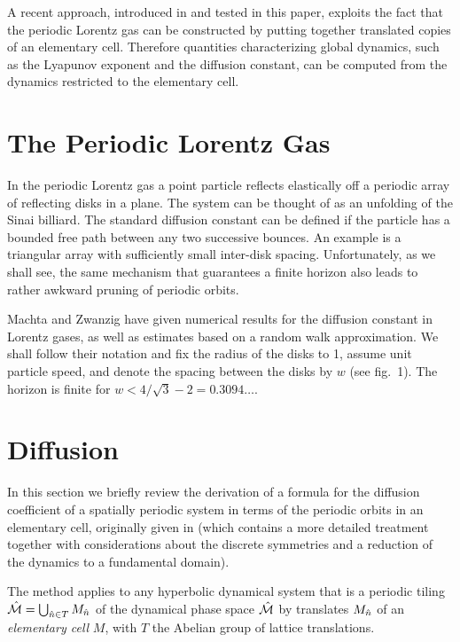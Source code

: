 \documentclass[pre,twocolumn,groupedaddress,showpacs,showkeys]{revtex4}
\begin{document}
A recent approach, introduced in  and
tested in this paper, exploits the fact that the periodic Lorentz
gas
can be constructed by putting together
translated copies of an elementary cell.
Therefore quantities characterizing global dynamics, such as
the Lyapunov exponent and the diffusion constant, can be
computed from the dynamics restricted to the elementary cell.

\section{The Periodic Lorentz Gas}
In the periodic Lorentz gas
a point particle reflects elastically off
a periodic array of reflecting disks in a plane.
The system can
be thought of as an unfolding of the Sinai billiard.
The standard diffusion constant can be defined if the particle has a bounded
free path between any two successive bounces.
An example is a triangular array with sufficiently small
inter-disk spacing.
Unfortunately, as we shall see,
the same mechanism that guarantees a finite horizon
also leads to rather awkward pruning of periodic orbits.


Machta and Zwanzig have given numerical results
for the diffusion constant in Lorentz gases,  as well as
estimates based on a random walk approximation. We shall follow
their notation and fix the radius of the disks to 1,
assume unit particle speed, and
denote the spacing between the disks by $w$ (see fig.~1).
The horizon is finite for $w < 4/\sqrt{3}-2 = 0.3094\dots$.

\section{Diffusion}
In this section we briefly review the
derivation of a formula for the diffusion coefficient
of a spatially periodic system in terms of the periodic orbits in an elementary
cell, originally given in  (which contains
a more detailed treatment together with considerations about the
discrete symmetries and a reduction of the dynamics to a fundamental domain).

The method applies to any  hyperbolic dynamical system that is a periodic
tiling $\hat {{\cal M}}=\bigcup_{ \hat n \in T} M_{\hat n}$ of the dynamical phase space $\hat {{\cal M}}$
by translates $M_{\hat n}$ of an {\sl elementary cell} $M$, with $T$ the
Abelian group of lattice translations.
\end{document}
